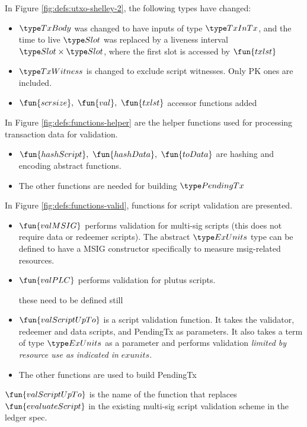 In Figure \ref{fig:defs:utxo-shelley-2}, the following types have changed:

\begin{itemize}
  \item $\TxBody$ was changed to have inputs of type $\TxInTx$, and the
  time to live $\Slot$ was replaced by a liveness interval $\Slot \times \Slot$,
  where the first slot is accessed by $\fun{txlst}$
  \item $\TxWitness$ is changed to exclude script witnesses. Only PK ones
  are included.
  \item $\fun{scrsize},~\fun{val},~\fun{txlst}$ accessor functions added
\end{itemize}

In Figure \ref{fig:defs:functions-helper} are the helper functions used for
processing transaction data for validation.

\begin{itemize}
  \item $\fun{hashScript},~ \fun{hashData},~\fun{toData}$ are hashing and encoding
  abstract functions.
  \item The other functions are needed for building $\PendingTx$
\end{itemize}

In Figure \ref{fig:defs:functions-valid}, functions for script validation
are presented.

\begin{itemize}
  \item $\fun{valMSIG}$ performs validation for multi-sig scripts
  (this does not require data or redeemer scripts). The abstract $\ExUnits$
  type can be defined to have a MSIG constructor specifically to
  measure msig-related resources.
  \item $\fun{valPLC}$ performs validation for plutus scripts.
  \begin{note}
    these need to be defined still
  \end{note}
\item $\fun{valScriptUpTo}$ is a script validation function. It takes the
validator, redeemer and data scripts, and PendingTx as parameters. It also
takes a term of type $\ExUnits$ as a parameter and performs validation
\textit{limited by resource use as indicated in} $exunits$.
\item The other functions are used to build PendingTx
\end{itemize}

\begin{note}
  $\fun{valScriptUpTo}$  is the name of the function that replaces
  $\fun{evaluateScript}$ in the existing multi-sig script validation
  scheme in the ledger spec.
\end{note}

